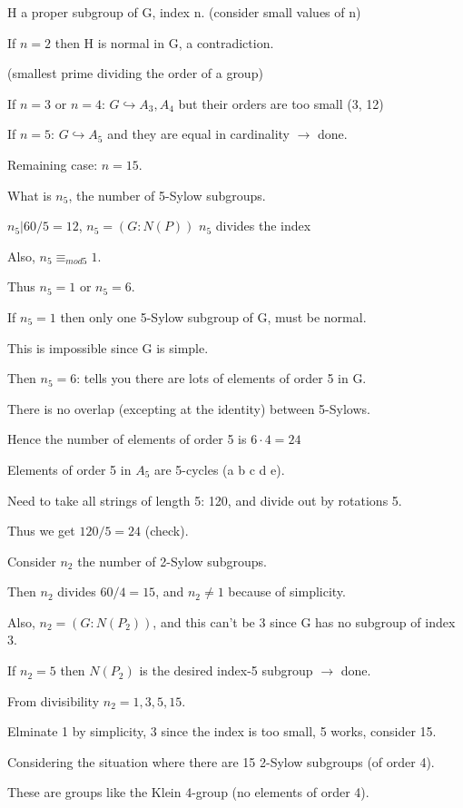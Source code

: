 \documentclass[12pt]{article}
\begin{document}
H a proper subgroup of G, index n.  (consider small values of n)

If $n = 2$ then H is normal in G, a contradiction.

(smallest prime dividing the order of a group)

If $n = 3$ or $n = 4$: $G \hookrightarrow A_3, A_4$ but their orders are too small (3, 12)

If $n = 5$: $G \hookrightarrow A_5$ and they are equal in cardinality $\to$ done.

Remaining case: $n = 15$.

What is $n_5$, the number of 5-Sylow subgroups.

$n_5 | 60\slash 5 = 12$, $n_5 = (G : N(P))$ $n_5$ divides the index

Also, $n_5 \equiv_{mod 5} 1$.

Thus $n_5 = 1$ or $n_5 = 6$.

If $n_5 = 1$ then only one 5-Sylow subgroup of G, must be normal.

This is impossible since G is simple.

Then $n_5 = 6$: tells you there are lots of elements of order 5 in G.

There is no overlap (excepting at the identity) between 5-Sylows.

Hence the number of elements of order 5 is $6 \cdot 4 = 24$

Elements of order 5 in $A_5$ are 5-cycles (a b c d e).

Need to take all strings of length 5: 120, and divide out by rotations 5.

Thus we get $120 \slash 5 = 24$ (check).

Consider $n_2$ the number of 2-Sylow subgroups.

Then $n_2$ divides $60/4 = 15$, and $n_2 \neq 1$ because of simplicity.

Also, $n_2 = (G : N(P_2))$, and this can't be 3 since G has no subgroup of index 3.

If $n_2 = 5$ then $N(P_2)$ is the desired index-5 subgroup $\to$ done.

From divisibility $n_2 = 1, 3, 5, 15$.

Elminate 1 by simplicity, 3 since the index is too small, 5 works, consider 15.

\noindent
Considering the situation where there are 15 2-Sylow subgroups (of order 4).

These are groups like the Klein 4-group (no elements of order 4).
\end{document}
